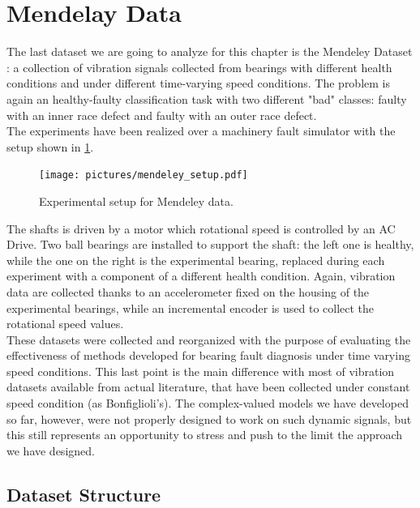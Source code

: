 \documentclass[../main.tex]{subfiles}
\begin{document}
\section{Mendelay Data}

The last dataset we are going to analyze for this chapter is the Mendeley Dataset \cite{mendeley_dataset}: a collection of vibration signals collected from bearings with different health conditions and under different time-varying speed conditions. The problem is again an healthy-faulty classification task with two different "bad" classes: faulty with an inner race defect and faulty with an outer race defect. \\
The experiments have been realized over a machinery fault simulator with the setup shown in \ref{fig:mendeley_setup}. 
\begin{figure}[!ht]
	\centering
	\texttt{[image: pictures/mendeley\_setup.pdf]}
	\caption{Experimental setup for Mendeley data.}
	\label{fig:mendeley_setup}
\end{figure}
The shafts is driven by a motor which rotational speed is controlled by an AC Drive. Two ball bearings are installed to support the shaft: the left one is healthy, while the one on the right is the experimental bearing, replaced during each experiment with a component of a different health condition. Again, vibration data are collected thanks to an accelerometer fixed on the housing of the experimental bearings,  while an incremental encoder is used to collect the rotational speed values.\\
These datasets were collected and reorganized with the purpose of evaluating the effectiveness of methods developed for bearing fault diagnosis under time varying speed conditions. This last point is the main difference with most of vibration datasets available from actual literature, that have been collected under constant speed condition (as Bonfiglioli's). The complex-valued models we have developed so far, however, were not properly designed to work on such dynamic signals, but this still represents an opportunity to stress and push to the limit the approach we have designed.

\subsection{Dataset Structure}
\end{document}
